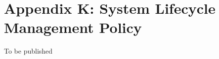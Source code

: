 \documentclass[../main.tex]{subfiles}
\begin{document}
\section{Appendix K: System Lifecycle Management Policy}
To be published
\end{document}
